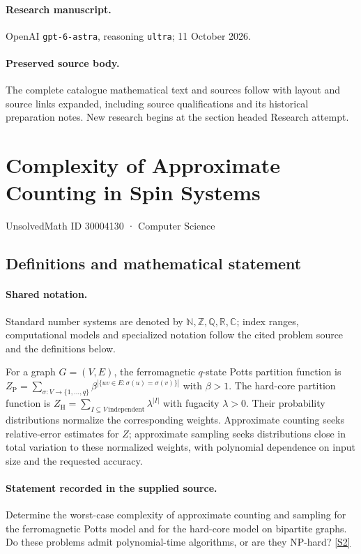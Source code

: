 \documentclass[11pt]{article}
\begin{document}
\paragraph{Research manuscript.} OpenAI \texttt{gpt-6-astra}, reasoning \texttt{ultra}; 11 October 2026.
\paragraph{Preserved source body.} The complete catalogue mathematical text and sources follow with layout and source links expanded, including source qualifications and its historical preparation notes. New research begins at the section headed Research attempt.

\section{Complexity of Approximate Counting in Spin Systems}\label{30004130}
{\small UnsolvedMath ID 30004130 · Computer Science}
\subsection{Definitions and mathematical statement}

\paragraph{Shared notation.}Standard number systems are denoted by $\mathbb N,\mathbb Z,\mathbb Q,\mathbb R,\mathbb C$; index ranges, computational models and specialized notation follow the cited problem source and the definitions below.


For a graph $G=(V,E)$, the ferromagnetic $q$-state Potts partition function is $Z_{\mathrm P}=\sum_{\sigma:V\to\{1,\ldots,q\}}\beta^{|\{uv\in E:\sigma(u)=\sigma(v)\}|}$ with $\beta>1$. The hard-core partition function is $Z_{\mathrm H}=\sum_{I\subseteq V\,\mathrm{independent}}\lambda^{|I|}$ with fugacity $\lambda>0$. Their probability distributions normalize the corresponding weights. Approximate counting seeks relative-error estimates for $Z$; approximate sampling seeks distributions close in total variation to these normalized weights, with polynomial dependence on input size and the requested accuracy.
\paragraph{Statement recorded in the supplied source.}
Determine the worst-case complexity of approximate counting and sampling for the ferromagnetic Potts model and for the hard-core model on bipartite graphs. Do these problems admit polynomial-time algorithms, or are they NP-hard? \href{https://doi.org/10.4171/owr/2019/19}{[S2]}
\end{document}
